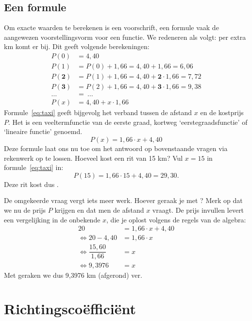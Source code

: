 \subsection{Een formule}
Om exacte waarden te berekenen is een voorschrift, een formule vaak de aangewezen voorstellingsvorm voor een functie. We redeneren als volgt: per extra km komt er  bij. Dit geeft volgende berekeningen:
\begin{align*}
P(0)&=4,40\\
P(1)&=P(0)+1,66=4,40+1,66=6,06\\
P(\mathbf{2})&=P(1)+1,66=4,40+\mathbf{2}\cdot 1,66=7,72\\
P(\mathbf{3})&=P(2)+1,66=4,40+\mathbf{3}\cdot 1,66= 9,38\\
\ldots \ &=\ \ldots \\
P(x)&=4,40+x\cdot 1,66
\end{align*}
Formule~\ref{eq:taxi} geeft bijgevolg het verband tussen de afstand $x$ en de kostprijs $P$. Het is een veeltermfunctie van de eerste graad, kortweg `eerstegraadsfunctie' of `lineaire functie' genoemd.
\begin{equation}\label{eq:taxi}
P(x)=1,66\cdot x + 4,40
\end{equation}
Deze formule laat ons nu toe om het antwoord op bovenstaande vragen via rekenwerk op te lossen. Hoeveel kost een rit van 15 km? Vul $x=15$ in formule~\eqref{eq:taxi} in:
\[
P(15)=1,66\cdot 15 + 4,40=29,30.
\]
Deze rit kost dus .

De omgekeerde vraag vergt iets meer werk. Hoever geraak je met ? Merk op dat we nu de prijs $P$ krijgen en dat men de afstand $x$ vraagt. De prijs invullen levert een vergelijking in de onbekende $x$, die je oplost volgens de regels van de algebra:
\begin{align*}
20&=1,66\cdot x + 4,40\\
\Leftrightarrow 20-4,40&=1,66 \cdot x\\
\Leftrightarrow \dfrac{15,60}{1,66}&=x\\
\Leftrightarrow 9,3976 &= x
\end{align*}
Met  geraken we dus 9,3976 km (afgerond) ver.

\section{Richtingscoëfficiënt}
